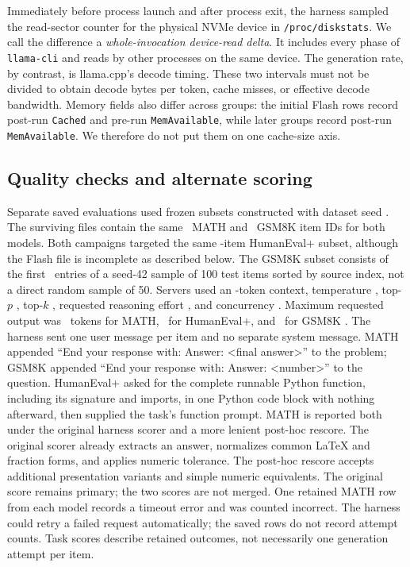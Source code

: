 \documentclass[11pt]{article}
\newcommand{\q}[1]{\texttt{#1}}
\begin{document}
Immediately before process launch and after process exit, the harness sampled
the read-sector counter for the physical NVMe device in
\q{/proc/diskstats}. We call the difference a \emph{whole-invocation
device-read delta}. It includes every phase of \q{llama-cli} and reads by
other processes on the same device. The generation rate, by contrast, is
llama.cpp's decode timing. These two intervals must not be divided to obtain
decode bytes per token, cache misses, or effective decode bandwidth. Memory
fields also differ across groups: the initial Flash rows record post-run
\q{Cached} and pre-run \q{MemAvailable}, while later groups record post-run
\q{MemAvailable}. We therefore do not put them on one cache-size axis.

\subsection{Quality checks and alternate scoring}

Separate saved evaluations used frozen subsets constructed with dataset seed
\PthreeDatasetSelectionSeed. The surviving files contain the same
\PthreeMathMatchedItems\ MATH and \PthreeGsmMatchedItems\ GSM8K item IDs for
both models. Both campaigns targeted the same
\PthreeHumanEvalFrozenItems-item HumanEval+ subset, although the Flash file is
incomplete as described below. The GSM8K subset consists of the first
\PthreeGsmMatchedItems\ entries of a seed-42 sample of 100 test items sorted
by source index, not a direct random sample of 50. Servers used an \PthreeQualityContext-token
context, temperature \PthreeQualityTemperature, top-$p$
\PthreeQualityTopP, top-$k$ \PthreeQualityTopK, requested reasoning effort
\q{\PthreeQualityReasoningEffort}, and concurrency
\PthreeQualityConcurrency. Maximum requested output was
\PthreeMathMaxTokens\ tokens for MATH, \PthreeCodeMaxTokens\ for HumanEval+,
and \PthreeGsmMaxTokens\ for GSM8K
\citep{hendrycks2021math,chen2021humaneval,liu2023evalplus,
cobbe2021gsm8k}. The harness sent one user message per item and no separate
system message. MATH appended ``End your response with: Answer: <final
answer>'' to the problem; GSM8K appended ``End your response with: Answer:
<number>'' to the question. HumanEval+ asked for the complete runnable Python
function, including its signature and imports, in one Python code block with
nothing afterward, then supplied the task's function prompt. MATH is reported
both under the original harness scorer and a
more lenient post-hoc rescore. The original scorer already extracts an answer,
normalizes common LaTeX and fraction forms, and applies numeric tolerance. The
post-hoc rescore accepts additional presentation variants and simple numeric
equivalents. The original score remains primary; the two scores are not
merged. One retained MATH row from each model records a timeout error and was
counted incorrect.
The harness could retry a failed request automatically; the saved rows do not
record attempt counts. Task scores describe retained outcomes, not necessarily
one generation attempt per item.
\end{document}
